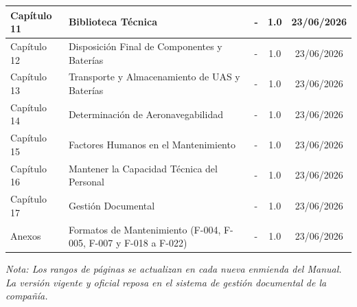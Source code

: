 \begin{longtable}{|p{2.6cm}|p{6.2cm}|p{2.4cm}|c|c|}
Capítulo 11 & Biblioteca Técnica & \pageref{inicio_cap11} - \pageref{fin_cap11} & 1.0 & 23/06/2026 \\ \hline
Capítulo 12 & Disposición Final de Componentes y Baterías & \pageref{inicio_cap12} - \pageref{fin_cap12} & 1.0 & 23/06/2026 \\ \hline
Capítulo 13 & Transporte y Almacenamiento de UAS y Baterías & \pageref{inicio_cap13} - \pageref{fin_cap13} & 1.0 & 23/06/2026 \\ \hline
Capítulo 14 & Determinación de Aeronavegabilidad & \pageref{inicio_cap14} - \pageref{fin_cap14} & 1.0 & 23/06/2026 \\ \hline
Capítulo 15 & Factores Humanos en el Mantenimiento & \pageref{inicio_cap15} - \pageref{fin_cap15} & 1.0 & 23/06/2026 \\ \hline
Capítulo 16 & Mantener la Capacidad Técnica del Personal & \pageref{inicio_cap16} - \pageref{fin_cap16} & 1.0 & 23/06/2026 \\ \hline
Capítulo 17 & Gestión Documental & \pageref{inicio_cap17} - \pageref{fin_cap17} & 1.0 & 23/06/2026 \\ \hline
Anexos & Formatos de Mantenimiento (F-004, F-005, F-007 y F-018 a F-022) & \pageref{inicio_anexos} - \pageref{fin_anexos} & 1.0 & 23/06/2026 \\ \hline
\end{longtable}

\textit{Nota: Los rangos de páginas se actualizan en cada nueva enmienda del Manual. La versión vigente y oficial reposa en el sistema de gestión documental de la compañía.}
